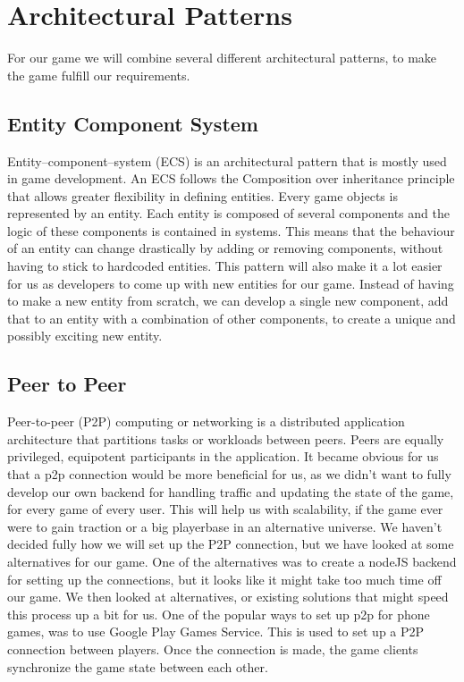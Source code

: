 \section{Architectural Patterns}
For our game we will combine several different architectural patterns, to make the game fulfill our requirements.

\subsection{Entity Component System}
Entity–component–system (ECS) is an architectural pattern that is mostly used in game development. An ECS follows the Composition over inheritance principle that allows greater flexibility in defining entities.
Every game objects is represented by an entity. Each entity is composed of several components and the logic of these components is contained in systems. This means that the behaviour of an entity can change drastically by adding or removing components, without having to stick to hardcoded entities.
This pattern will also make it a lot easier for us as developers to come up with new entities for our game. Instead of having to make a new entity from scratch, we can develop a single new component, add that to an entity with a combination of other components, to create a unique and possibly exciting new entity.

\subsection{Peer to Peer}
Peer-to-peer (P2P) computing or networking is a distributed application architecture that partitions tasks or workloads between peers. Peers are equally privileged, equipotent participants in the application.
It became obvious for us that a p2p connection would be more beneficial for us, as we didn't want to fully develop our own backend for handling traffic and updating the state of the game, for every game of every user. This will help us with scalability, if the game ever were to gain traction or a big playerbase in an alternative universe.
We haven't decided fully how we will set up the P2P connection, but we have looked at some alternatives for our game.
One of the alternatives was to create a nodeJS backend for setting up the connections, but it looks like it might take too much time off our game. We then looked at alternatives, or existing solutions that might speed this process up a bit for us.
One of the popular ways to set up p2p for phone games, was to use Google Play Games Service. This is used to set up a P2P connection between players. Once the connection is made, the game clients synchronize the game state between each other.

